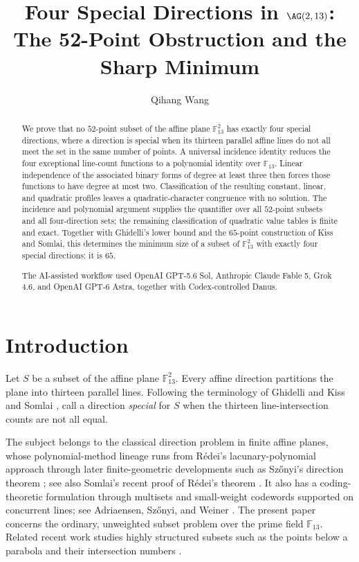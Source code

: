 \documentclass[11pt]{amsart}
\title[Four special directions in $\AG(2,13)$]
{Four Special Directions in $\AG(2,13)$:\\
The 52-Point Obstruction and the Sharp Minimum}
\author{Qihang Wang}
\theoremstyle{remark}
\newcommand{\F}{\mathbb F}
\begin{document}
\begin{abstract}
We prove that no $52$-point subset of the affine plane $\F_{13}^{2}$ has
exactly four special directions, where a direction is special when its
thirteen parallel affine lines do not all meet the set in the same number of
points.  A universal incidence identity reduces the four exceptional line-count
functions to a polynomial identity over $\F_{13}$.  Linear independence of the
associated binary forms of degree at least three then forces those functions
to have degree at most two.  Classification of the resulting constant, linear,
and quadratic profiles leaves a quadratic-character congruence with no
solution.  The incidence and polynomial argument supplies the quantifier over
all $52$-point subsets and all four-direction sets; the remaining
classification of quadratic value tables is finite and exact.  Together with
Ghidelli's lower bound and the $65$-point construction of Kiss and Somlai,
this determines the minimum size of a subset of $\F_{13}^{2}$ with exactly
four special directions: it is $65$.

The AI-assisted workflow used OpenAI GPT-5.6 Sol, Anthropic Claude Fable 5,
Grok 4.6, and OpenAI GPT-6 Astra, together with Codex-controlled Danus.
\end{abstract}

\maketitle

\section{Introduction}

Let $S$ be a subset of the affine plane $\F_{13}^{2}$.  Every affine
direction partitions the plane into thirteen parallel lines.  Following the
terminology of Ghidelli \cite{GhidelliRichPoor} and Kiss and Somlai
\cite{KissSomlaiSpecialDirections}, call a direction \emph{special} for $S$
when the thirteen line-intersection counts are not all equal.

The subject belongs to the classical direction problem in finite affine
planes, whose polynomial-method lineage runs from R\'edei's lacunary-polynomial
approach \cite{RedeiLacunary} through later finite-geometric developments such
as Sz\H{o}nyi's direction theorem \cite{SzonyiDirections}; see also Somlai's
recent proof of R\'edei's theorem \cite{SomlaiRedei}.  It also has a
coding-theoretic formulation through multisets and small-weight codewords
supported on concurrent lines; see Adriaensen, Sz\H{o}nyi, and Weiner
\cite{AdriaensenSzonyiWeiner}.  The present paper concerns the ordinary,
unweighted subset problem over the prime field $\F_{13}$.  Related recent
work studies highly structured subsets such as the points below a parabola
and their intersection numbers
\cite{AdriaensenWeinerParabola}.
\end{document}
